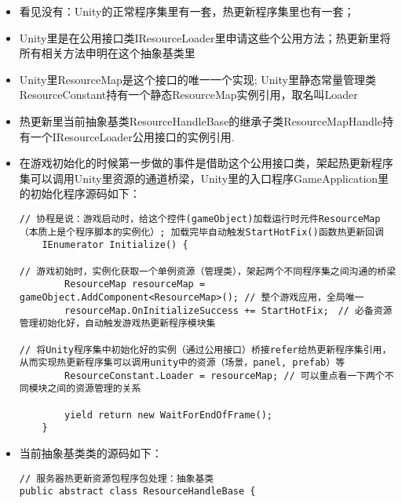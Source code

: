 \documentclass[9pt, b5paper]{article}
\begin{document}
\begin{itemize}
\item 看见没有：Unity的正常程序集里有一套，热更新程序集里也有一套；
\item Unity里是在公用接口类IResourceLoader里申请这些个公用方法；热更新里将所有相关方法申明在这个抽象基类里
\item Unity里ResourceMap是这个接口的唯一一个实现; Unity里静态常量管理类ResourceConstant持有一个静态ResourceMap实例引用，取名叫Loader
\item 热更新里当前抽象基类ResourceHandleBase的继承子类ResourceMapHandle持有一个IResourceLoader公用接口的实例引用.
\item 在游戏初始化的时候第一步做的事件是借助这个公用接口类，架起热更新程序集可以调用Unity里资源的通道桥梁，Unity里的入口程序GameApplication里的初始化程序源码如下：
\begin{verbatim}
// 协程是说：游戏启动时，给这个控件(gameObject)加载运行时元件ResourceMap（本质上是个程序脚本的实例化）; 加载完毕自动触发StartHotFix()函数热更新回调
    IEnumerator Initialize() { 

// 游戏初始时，实例化获取一个单例资源（管理类），架起两个不同程序集之间沟通的桥梁
        ResourceMap resourceMap = gameObject.AddComponent<ResourceMap>(); // 整个游戏应用，全局唯一
        resourceMap.OnInitializeSuccess += StartHotFix;　// 必备资源管理初始化好，自动触发游戏热更新程序模块集

// 将Unity程序集中初始化好的实例（通过公用接口）桥接refer给热更新程序集引用，从而实现热更新程序集可以调用unity中的资源（场景，panel, prefab）等
        ResourceConstant.Loader = resourceMap; // 可以重点看一下两个不同模块之间的资源管理的关系

        yield return new WaitForEndOfFrame();
    }
\end{verbatim}
\item 当前抽象基类类的源码如下：
\begin{verbatim}
// 服务器热更新资源包程序包处理：抽象基类
public abstract class ResourceHandleBase {


\end{verbatim}
\end{itemize}
\end{document}
